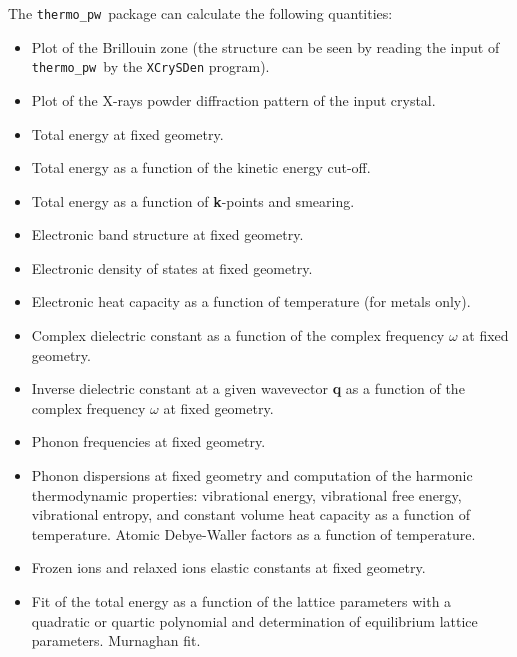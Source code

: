 \documentclass[12pt,a4paper]{article}
\def\thermo{\texttt{thermo\_pw}}
\begin{document}
The \thermo\ package can calculate the following quantities:
\begin{itemize}
\item Plot of the Brillouin zone (the structure can be seen by reading the
input of \thermo\ by the \texttt{XCrySDen} program).

\item Plot of the X-rays powder diffraction pattern of the input crystal.

\item Total energy at fixed geometry.

\item Total energy as a function of the kinetic energy cut-off.

\item Total energy as a function of {\bf k}-points and smearing.

\item Electronic band structure at fixed geometry.

\item Electronic density of states at fixed geometry.

\item Electronic heat capacity as a function of temperature (for metals only).

\item Complex dielectric constant as a function of the complex
frequency $\omega$ at fixed geometry.

\item Inverse dielectric constant at a given wavevector {\bf q} as a function 
of the complex frequency $\omega$ at fixed geometry.

\item Phonon frequencies at fixed geometry.

\item Phonon dispersions at fixed geometry and computation of the harmonic
thermodynamic properties: vibrational energy, vibrational free energy,
vibrational entropy, and constant volume heat capacity as a function of
temperature. Atomic Debye-Waller factors as a function of temperature.

\item Frozen ions and relaxed ions elastic constants at fixed geometry.

\item Fit of the total energy as a function of the lattice parameters with
a quadratic or quartic polynomial and determination of equilibrium lattice 
parameters. Murnaghan fit.


\end{itemize}
\end{document}
